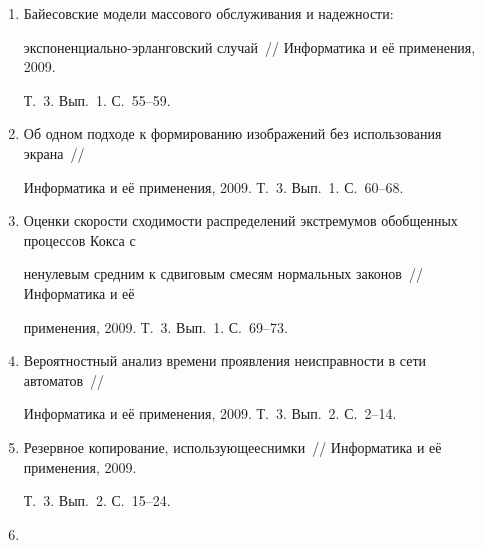 \begin{enumerate}[1.]
О нестационарных системах обслуживания с катастрофами~// Информатика и её 


применения, 2009. Т.~3. Вып.~1. С.~47--54.





\item {}


Байесовские модели массового обслуживания и надежности: 


экспо\-нен\-ци\-аль\-но-эр\-лан\-гов\-ский случай~// Информатика и её применения, 2009. 


Т.~3. Вып.~1. С.~55--59.





\item {}


Об одном подходе к формированию изображений без использования экрана~// 


Информатика и её применения, 2009. Т.~3. Вып.~1. С.~60--68.





\item {}


Оценки скорости сходимости распределений экстремумов обобщенных процессов Кокса с 


ненулевым средним к сдвиговым смесям нормальных законов~// Информатика и её 


применения, 2009. Т.~3. Вып.~1. С.~69--73.





\item {}


Вероятностный анализ времени проявления неисправности в сети автоматов~// 


Информатика и её применения, 2009. Т.~3. Вып.~2. С.~2--14.





\item {}


Резервное копирование, использующее\linebreak сним\-ки~// Информатика и её применения, 2009. 


Т.~3. Вып.~2. С.~15--24.





\item {}



\end{enumerate}
